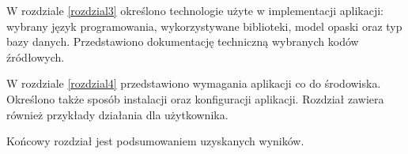 W rozdziale \ref{rozdzial3} określono technologie użyte w implementacji aplikacji: wybrany język programowania, wykorzystywane biblioteki, model opaski oraz typ bazy danych. Przedstawiono dokumentację techniczną wybranych kodów źródłowych. 

W rozdziale \ref{rozdzial4} przedstawiono wymagania aplikacji co do środowiska. Określono także sposób instalacji oraz konfiguracji aplikacji. Rozdział zawiera również przykłady działania dla użytkownika.

Końcowy rozdział jest podsumowaniem uzyskanych wyników.



